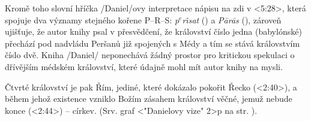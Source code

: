 Kromě toho slovní hříčka \x/Daniel/ovy interpretace nápisu na zdi v <5:28>, která spojuje dva významy stejného kořene P--R--S: {\it p$^e$r\oldaccents\^\i sat\/} () a
{\it P\oldaccents\=ar\oldaccents\=as} (), zároveň ujišťuje, že autor knihy psal v přesvědčení, že království číslo jedna (babylónské) přechází pod
nadvládu Peršanů již spojených s Médy a tím se stává královstvím číslo dvě. Kniha \x/Daniel/ neponechává žádný prostor pro kritickou spekulaci o dřívějším médském království, které
údajně mohl mít autor knihy na mysli.

Čtvrté království je pak Řím, jediné, které dokázalo pokořit Řecko (<2:40>), a během jehož existence vzniklo Božím zásahem království věčné, jemuž nebude konce (<2:44>) -- církev.
(Srv. graf <"Danielovy vize"  2>p na str. \pg).


\endinput
\bye


